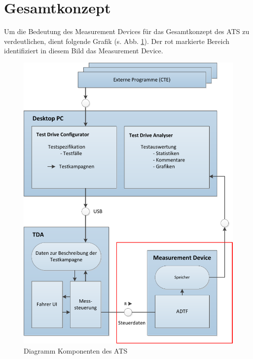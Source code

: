 \documentclass[12pt,a4paper]{report}
\begin{document}
\section{Gesamtkonzept}\label{sec:Gesamtkonzept}
Um die Bedeutung des Measurement Devices für das Gesamtkonzept des ATS zu verdeutlichen, dient folgende Grafik (s. Abb. \ref{pic:Blockdiagramm}). Der rot markierte Bereich identifiziert in diesem Bild das Measurement Device.
\begin{figure}
\begin{center}
\includegraphics[scale=1.1]{Darstellungen/UebersichtKonzept}
\caption{Diagramm Komponenten des ATS}\label{pic:Blockdiagramm}
\end{center}
\end{figure}
\end{document}
